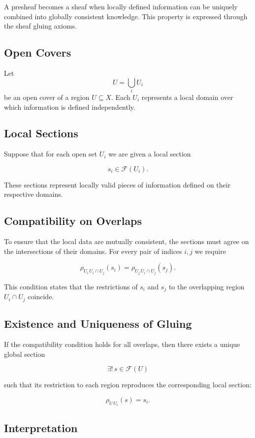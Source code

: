 \documentclass[12pt]{article}
\begin{document}
A presheaf becomes a sheaf when locally defined information can be uniquely combined into globally consistent knowledge. This property is expressed through the sheaf gluing axioms.

\subsection{Open Covers}

Let
\[
U = \bigcup_i U_i
\]
be an open cover of a region $U \subseteq X$. Each $U_i$ represents a local domain over which information is defined independently.

\subsection{Local Sections}

Suppose that for each open set $U_i$ we are given a local section

\[
s_i \in \mathcal{F}(U_i).
\]

These sections represent locally valid pieces of information defined on their respective domains.

\subsection{Compatibility on Overlaps}

To ensure that the local data are mutually consistent, the sections must agree on the intersections of their domains. For every pair of indices $i,j$ we require

\[
\rho_{U_i\, U_i \cap U_j}(s_i)
=
\rho_{U_j\, U_i \cap U_j}(s_j).
\]

This condition states that the restrictions of $s_i$ and $s_j$ to the overlapping region $U_i \cap U_j$ coincide.

\subsection{Existence and Uniqueness of Gluing}

If the compatibility condition holds for all overlaps, then there exists a unique global section

\[
\exists !\, s \in \mathcal{F}(U)
\]

such that its restriction to each region reproduces the corresponding local section:

\[
\rho_{U\,U_i}(s) = s_i.
\]

\subsection{Interpretation}
\end{document}
